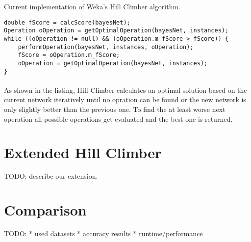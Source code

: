\documentclass[paper=a4, fontsize=11pt]{scrartcl} %
\numberwithin{equation}{section} %
\numberwithin{figure}{section} %
\numberwithin{table}{section} %
\begin{document}
Current implementation of Weka's Hill Climber algorithm.

\begin{lstlisting}
double fScore = calcScore(bayesNet);
Operation oOperation = getOptimalOperation(bayesNet, instances);
while ((oOperation != null) && (oOperation.m_fScore > fScore)) {
	performOperation(bayesNet, instances, oOperation);
	fScore = oOperation.m_fScore;
	oOperation = getOptimalOperation(bayesNet, instances);
}  
\end{lstlisting}

\paragraph{}As shown in the listing, Hill Climber calculates an optimal solution based on the current network iteratively until no opration can be found or the new network is only slightly better than the previous one. To find the at least worse next operation all possible operations get evaluated and the best one is returned. 


\section{Extended Hill Climber}

TODO: describe our extension.


\section{Comparison}

TODO:
* used datasets
* accuracy results
* runtime/performance



\end{document}
